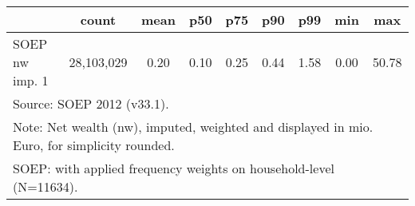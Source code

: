{
\def\sym#1{\ifmmode^{#1}\else\(^{#1}\)\fi}
\begin{tabular}{l*{1}{cccccccc}}
\hline\hline
                                            &       count&        mean&         p50&         p75&         p90&         p99&         min&         max\\
\hline
SOEP nw imp. 1                              &  28,103,029&        0.20&        0.10&        0.25&        0.44&        1.58&        0.00&       50.78\\
\hline\hline
\multicolumn{9}{l}{\footnotesize Source: SOEP 2012 (v33.1).}\\
\multicolumn{9}{l}{\footnotesize Note: Net wealth (nw), imputed, weighted and displayed in mio. Euro, for simplicity rounded.}\\
\multicolumn{9}{l}{\footnotesize SOEP: with applied frequency weights on household-level (N=11634).}\\
\end{tabular}
}
